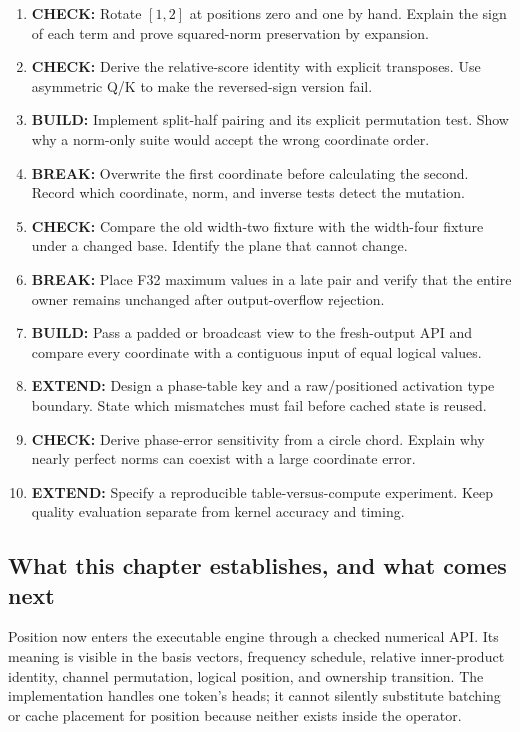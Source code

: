 \documentclass[
  10pt,
]{article}
\providecommand{\tightlist}{%
  \setlength{\itemsep}{0pt}\setlength{\parskip}{0pt}}
\begin{document}
\begin{enumerate}
\def\labelenumi{\arabic{enumi}.}
\tightlist
\item
  \textbf{CHECK:} Rotate \([1,2]\) at positions zero and one by hand.
  Explain the sign of each term and prove squared-norm preservation by
  expansion.
\item
  \textbf{CHECK:} Derive the relative-score identity with explicit
  transposes. Use asymmetric Q/K to make the reversed-sign version fail.
\item
  \textbf{BUILD:} Implement split-half pairing and its explicit
  permutation test. Show why a norm-only suite would accept the wrong
  coordinate order.
\item
  \textbf{BREAK:} Overwrite the first coordinate before calculating the
  second. Record which coordinate, norm, and inverse tests detect the
  mutation.
\item
  \textbf{CHECK:} Compare the old width-two fixture with the width-four
  fixture under a changed base. Identify the plane that cannot change.
\item
  \textbf{BREAK:} Place F32 maximum values in a late pair and verify
  that the entire owner remains unchanged after output-overflow
  rejection.
\item
  \textbf{BUILD:} Pass a padded or broadcast view to the fresh-output
  API and compare every coordinate with a contiguous input of equal
  logical values.
\item
  \textbf{EXTEND:} Design a phase-table key and a raw/positioned
  activation type boundary. State which mismatches must fail before
  cached state is reused.
\item
  \textbf{CHECK:} Derive phase-error sensitivity from a circle chord.
  Explain why nearly perfect norms can coexist with a large coordinate
  error.
\item
  \textbf{EXTEND:} Specify a reproducible table-versus-compute
  experiment. Keep quality evaluation separate from kernel accuracy and
  timing.
\end{enumerate}

\subsection{What this chapter establishes, and what comes
next}\label{what-this-chapter-establishes-and-what-comes-next}

Position now enters the executable engine through a checked numerical
API. Its meaning is visible in the basis vectors, frequency schedule,
relative inner-product identity, channel permutation, logical position,
and ownership transition. The implementation handles one token's heads;
it cannot silently substitute batching or cache placement for position
because neither exists inside the operator.
\end{document}
